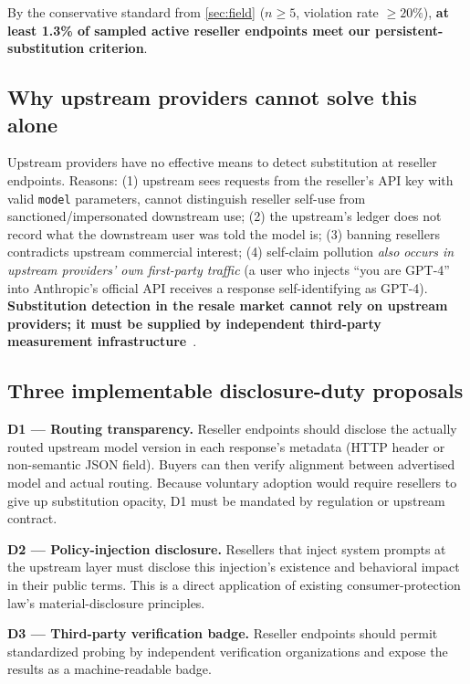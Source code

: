 \documentclass[10pt,a4paper,twocolumn]{article}
\begin{document}
By the conservative standard from \cref{sec:field} ($n{\geq}5$, violation rate
${\geq}20\%$), \textbf{at least 1.3\% of sampled active reseller endpoints
meet our persistent-substitution criterion}.

\subsection{Why upstream providers cannot solve this alone}
Upstream providers have no effective means to detect substitution at reseller
endpoints. Reasons: (1) upstream sees requests from the reseller's API key with
valid \texttt{model} parameters, cannot distinguish reseller self-use from
sanctioned/impersonated downstream use; (2) the upstream's ledger does not
record what the downstream user was told the model is; (3) banning resellers
contradicts upstream commercial interest; (4) self-claim pollution
\emph{also occurs in upstream providers' own first-party traffic} (a user who
injects ``you are GPT-4'' into Anthropic's official API receives a response
self-identifying as GPT-4). \textbf{Substitution detection in the resale
market cannot rely on upstream providers; it must be supplied by independent
third-party measurement infrastructure}~\cite{akerlof1970lemons}.

\subsection{Three implementable disclosure-duty proposals}
\textbf{D1 --- Routing transparency.} Reseller endpoints should disclose the
actually routed upstream model version in each response's metadata (HTTP
header or non-semantic JSON field). Buyers can then verify alignment between
advertised model and actual routing. Because voluntary adoption would require resellers to give up substitution
opacity, D1 must be mandated by regulation or upstream contract.

\textbf{D2 --- Policy-injection disclosure.} Resellers that inject system
prompts at the upstream layer must disclose this injection's existence and
behavioral impact in their public terms. This is a direct application of
existing consumer-protection law's material-disclosure principles.

\textbf{D3 --- Third-party verification badge.} Reseller endpoints should
permit standardized probing by independent verification organizations and
expose the results as a machine-readable badge.

\end{document}
